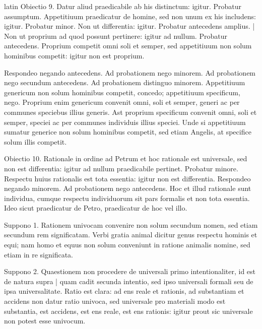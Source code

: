 \begin{otherlanguage*}{latin}
\pstart
Obiectio 9. Datur aliud praedicabile ab his distinctum:
igitur. Probatur assumptum. Appetitiuum praedicatur de homine, sed non unum ex his includens:
igitur. Probatur minor. Non ut differentia:
igitur. Probatur antecedens amplius. \textnormal{|} Non ut proprium ad quod possunt pertinere:
igitur ad nullum. Probatur antecedens. Proprium competit omni soli et semper, sed appetitiuum non solum hominibus competit:
igitur non est proprium. 
\pend

\pstart
Respondeo negando antecedens. Ad probationem nego minorem. Ad probationem nego secundum antecedens. Ad probationem distinguo minorem. Appetitiuum genericum non solum hominibus competit, concedo; appetitiuum specificum, nego. Proprium enim genericum convenit omni, soli et semper, generi ac per communes speciebus illius generis. Ast proprium specificum convenit omni, soli et semper, speciei ac per communes individuis illius speciei. Unde si appetitiuum sumatur generice non solum hominibus competit, sed etiam Angelis, at specifice solum illis competit. 
\pend

\pstart
Obiectio 10. Rationale in ordine ad Petrum et hoc rationale est universale, sed non est differentia:
igitur ad nullum praedicabile pertinet. Probatur minore. Respectu huius rationalis est tota essentia:
igitur non est differentia. Respondeo negando minorem. Ad probationem nego antecedens. Hoc et illud rationale sunt individua, cumque respectu individuorum sit pars formalis et non tota essentia. Ideo sicut praedicatur de Petro, praedicatur de hoc vel illo. 
\pend

\pstart
{}
\pend

\pstart
Suppono 1. Rationem univocam convenire non solum secundum nomen, sed etiam secundum rem significatam. Verbi gratia animal dicitur genus respectu hominis et equi; nam homo et equus non solum conveniunt in ratione animalis nomine, sed etiam in re significata. 
\pend

\pstart
Suppono 2. Quaestionem non procedere de universali primo intentionaliter, id est de natura supra \textnormal{|} quam cadit secunda intentio, sed ipso universali formali seu de ipsa universalitate. Ratio est clara:
ad ens reale et rationis, ad substantiam et accidens non datur ratio univoca, sed universale pro materiali modo est substantia, est accidens, est ens reale, est ens rationis:
igitur prout sic universale non potest esse univocum. 
\pend


\end{otherlanguage*}
